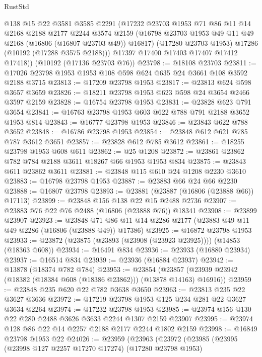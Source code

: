 \begin{lexlean}{RustStd}
\begin{coremodule}
        @138
        @15
        @22
        @3581
        @3585
        @2291
        (@17232
          @23703
          @1953
          @71
          @86
          @11
          @14
          @2168
          @2188
          @2177
          @2244
          @3574
          @2159
          (@16798 @23703 @1953 @49 @11 @49 @2168 (@16806 (@16807 @23703 @49)) @16817)
          (@17280 @23703 @1953)
          @17286
          (@10192 (@17288 @3575 @2188)))
        @17397
        @17400
        @17403
        @17407
        @17412
        @17418))
    (@10192 (@17136 @23703 @76))
@23798 := @18108 @23703
@23811 := @17026 @23798 @1953 @1953 @108 @598 @624 @635 @24 @3661 @108 @3592 @2188 @3715
@23813 := @17209 @23798 @1953
@23817 := @23813 @624 @598 @3657 @3659
@23826 := @18211 @23798 @1953 @623 @598 @24 @3654 @2466 @3597 @2159
@23828 := @16754 @23798 @1953
@23831 := @23828 @623 @791 @3654
@23841 := @16763 @23798 @1953 @603 @622 @788 @791 @2188 @3652 @1953 @814
@23843 := @16777 @23798 @1953
@23846 := @23843 @622 @788 @3652
@23848 := @16786 @23798 @1953
@23854 := @23848 @612 @621 @785 @787 @3612 @3651
@23857 := @23828 @612 @785 @3612
@23861 := @18255 @23798 @1953 @608 @611
@23862 := @25 @1208
@23872 := @23861 @23862 @782 @784 @2188 @3611 @18267 @66 @1953 @1953 @834
@23875 := @23843 @611 @23862 @3611
@23881 := @23848 @115 @610 @24 @1208 @2230 @3610
@23883 := @16798 @23798 @1953
@23887 := @23883 @66 @24 @66 @2230
@23888 := @16807 @23798
@23893 := @23881 (@23887 (@16806 (@23888 @66)) @17113)
@23899 := @23848 @156 @138 @22 @15 @2488 @2736
@23907 := @23883 @76 @22 @76 @2488 (@16806 (@23888 @76)) @18341
@23908 := @23899 @23907
@23923 := @23848 @71 @86 @11 @14 @2286 @2177 (@23883 @49 @11 @49 @2286 (@16806 (@23888 @49)) @17386)
@23925 := @16872 @23798 @1953
@23933 := @23872 (@23875 (@23893 (@23908 (@23923 @23925)))) (@14853 (@18363 @608))
@23934 := @16491 @834
@23936 := @23933 (@16880 @23934)
@23937 := @16514 @834
@23939 := @23936 (@16884 @23937)
@23942 := @13878 (@18374 @782 @784)
@23953 := @23854
    (@23857 (@23939 @23942 (@18382 (@18384 @608 (@18386 @23862))) (@13878 @14163) @16916))
@23959 := @23848 @235 @620 @22 @782 @3638 @3650
@23963 := @23813 @235 @22 @3627 @3636
@23972 := @17219 @23798 @1953 @125 @234 @281 @22 @3627 @3634 @2264
@23974 := @17232 @23798 @1953
@23985 := @23974 @156 @130 @22 @280 @2488 @3626 @3633 @2244 @1307 @2159 @23907
@23995 := @23974 @128 @86 @22 @14 @2257 @2188 @2177 @2244 @1802 @2159
@23998 := @16849 @23798 @1953 @22
@24026 := @23959
    (@23963
      (@23972
        (@23985
          (@23995
            (@23998 @127 @2257 @17270 @17274)
            (@17280 @23798 @1953)

\end{coremodule}
\end{lexlean}
